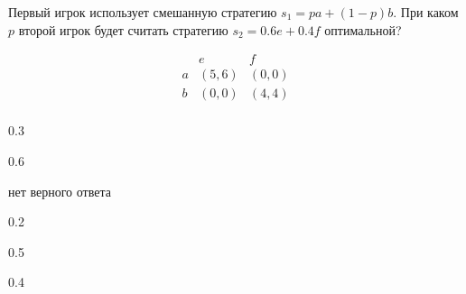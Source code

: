 
\begin{question}
Первый игрок использует смешанную стратегию \(s_1 = p a + (1-p)b\).
При каком \(p\) второй игрок будет считать стратегию \(s_2 = 0.6 e + 0.4 f\) оптимальной?

\[
\begin{matrix}
   & e & f \\
a  & (5, 6) & (0, 0) \\
b  & (0, 0) & (4, 4) \\
\end{matrix}
\]
\begin{answerlist}
  \item 0.3
  \item 0.6
  \item нет верного ответа
  \item 0.2
  \item 0.5
  \item 0.4
\end{answerlist}
\end{question}


